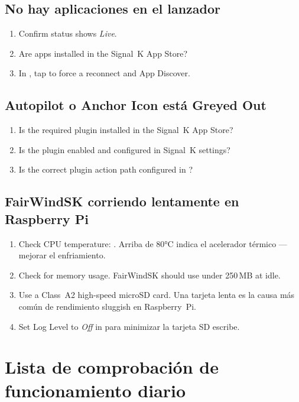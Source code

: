 \section{No hay aplicaciones en el lanzador}

\begin{enumerate}
  \item Confirm status shows \textit{Live}.
  \item Are apps installed in the Signal~K App Store?
  \item In , tap  to force a reconnect and
App Discover.
\end{enumerate}

\section{Autopilot o Anchor Icon está Greyed Out}

\begin{enumerate}
  \item Is the required plugin installed in the Signal~K App Store?
  \item Is the plugin enabled and configured in Signal~K settings?
  \item Is the correct plugin action path configured in
        ?
\end{enumerate}

\section{FairWindSK corriendo lentamente en Raspberry Pi}

\begin{enumerate}
  \item Check CPU temperature: .
Arriba de 80°C indica el acelerador térmico --- mejorar el enfriamiento.
  \item Check  for memory usage.
        FairWindSK should use under 250\,MB at idle.
  \item Use a Class~A2 high-speed microSD card.
Una tarjeta lenta es la causa más común de rendimiento sluggish en Raspberry~Pi.
  \item Set Log Level to \textit{Off} in 
para minimizar la tarjeta SD escribe.
\end{enumerate}

\chapter{Lista de comprobación de funcionamiento diario}
\label{ch:checklist}

